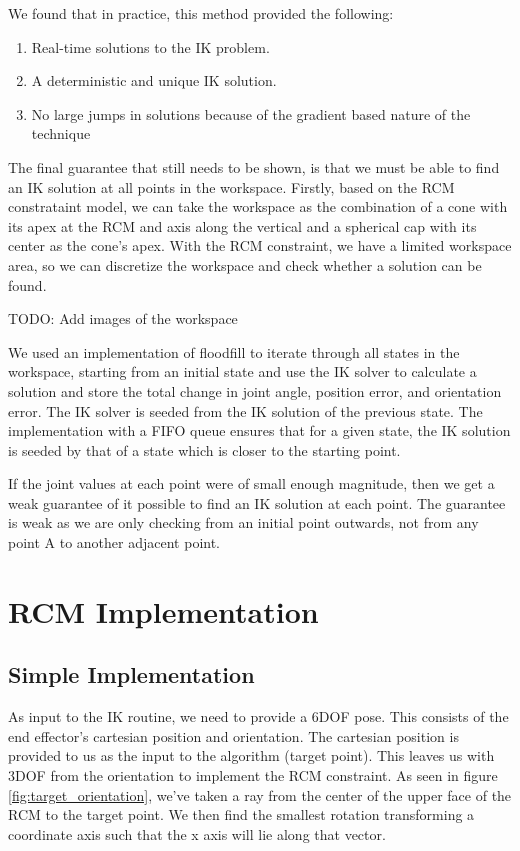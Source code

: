 \documentclass[BTech]{iitmdiss}
\begin{document}
    We found that in practice, this method provided the following:
    \begin{enumerate}
        \item Real-time solutions to the IK problem.
        \item A deterministic and unique IK solution.
        \item No large jumps in solutions because of the gradient based nature of the technique
    \end{enumerate}

    The final guarantee that still needs to be shown, is that we must be able to find an IK solution at all points in the workspace.
    Firstly, based on the RCM constrataint model, we can take the workspace as the combination of a cone with its apex at the RCM
    and axis along the vertical and a spherical cap with its center as the cone's apex.
    With the RCM constraint, we have a limited workspace area, so we can discretize the workspace and check whether a
    solution can be found.

    TODO: Add images of the workspace

    We used an implementation of floodfill to iterate through all states in the workspace, starting from an initial state
    and use the IK solver to calculate a solution and store the total change in joint angle, position error, and orientation error.
    The IK solver is seeded from the IK solution of the previous state.
    The implementation with a FIFO queue ensures that for a given state, the IK solution is seeded by that of a state which is closer to the starting point.

    If the joint values at each point were of small enough magnitude, then we get a weak guarantee of it possible to find an IK solution at each point.
    The guarantee is weak as we are only checking from an initial point outwards, not from any point A to another adjacent point.


    \section{RCM Implementation}

    \subsection{Simple Implementation}\label{subsec:simple-rcm-impl}

    As input to the IK routine, we need to provide a 6DOF pose.
    This consists of the end effector's cartesian position and orientation.
    The cartesian position is provided to us as the input to the algorithm (target point).
    This leaves us with 3DOF from the orientation to implement the RCM constraint.
    As seen in figure \ref{fig:target_orientation}, we've taken a ray from the center of the upper face of the RCM to the target point.
    We then find the smallest rotation transforming a coordinate axis such that the x axis will lie along that vector.
\end{document}
